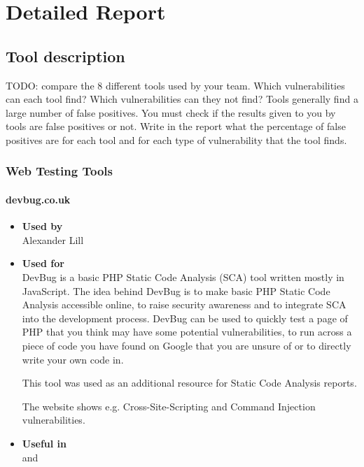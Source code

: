 \chapter{Detailed Report}\label{chapter:detailed_report}

\section{Tool description}

TODO:\newline
compare the 8 different tools used by your team. Which vulnerabilities can each
tool find? Which vulnerabilities can they not find?\newline
Tools generally find a large number of false positives. You must check if the results given to you by tools
are false positives or not. Write in the report what the percentage of false positives are for each tool and
for each type of vulnerability that the tool finds.

\subsection*{Web Testing Tools}

\subsubsection*{devbug.co.uk}
\begin{itemize}
	\item \textbf{Used by}\\ Alexander Lill
	\item \textbf{Used for}\\
	DevBug is a basic PHP Static Code Analysis (SCA) tool written mostly in JavaScript. The idea behind DevBug is to make basic PHP Static Code Analysis accessible online, to raise security awareness and to integrate SCA into the development process. DevBug can be used to quickly test a page of PHP that you think may have some potential vulnerabilities, to run across a piece of code you have found on Google that you are unsure of or to directly write your own code in.
	
	This tool was used as an additional resource for Static Code Analysis reports.
	
	The website shows e.g. Cross-Site-Scripting and Command Injection vulnerabilities.
	\item \textbf{Useful in}\\  and 
\end{itemize}

